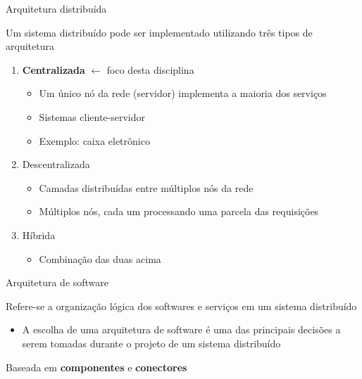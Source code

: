 \documentclass[compress]{beamer}
\begin{document}

\begin{frame}{Arquitetura distribuída}

Um sistema distribuído pode ser implementado utilizando três tipos de arquitetura
\begin{enumerate}
    \item \textbf{Centralizada} \textcolor{sthlmDarkBlue}{$\mathbf{\leftarrow}$} {\footnotesize foco desta disciplina}
    \begin{itemize}
        \item Um único nó da rede (servidor) implementa a maioria dos serviços
        \item Sistemas cliente-servidor
        \item Exemplo: caixa eletrônico
    \end{itemize}
    \item Descentralizada
    \begin{itemize}
        \item Camadas distribuídas entre múltiplos nós da rede
        \item Múltiplos nós, cada um processando uma parcela das requisições
    \end{itemize}
    \item Híbrida
    \begin{itemize}
        \item Combinação das duas acima
    \end{itemize}
\end{enumerate}

\end{frame}


\begin{frame}{Arquitetura de software}

Refere-se a organização lógica dos softwares e serviços em um sistema distribuído
\begin{itemize}
    \item A escolha de uma arquitetura de software é uma das principais decisões a serem tomadas durante o projeto de um sistema distribuído
\end{itemize}

\vspace{0.5cm}

Baseada em \textbf{componentes} e \textbf{conectores}

\end{frame}
\end{document}
